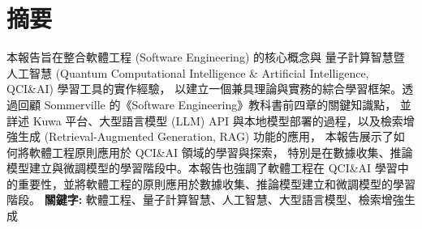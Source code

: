\documentclass[twocolumn,11pt,a4paper]{article}
\begin{document}

\section*{摘要}
本報告旨在整合軟體工程 (Software Engineering) 的核心概念與
量子計算智慧暨人工智慧 (Quantum Computational Intelligence \& Artificial Intelligence, QCI\&AI) 學習工具的實作經驗，
以建立一個兼具理論與實務的綜合學習框架。透過回顧 Sommerville 的《Software Engineering》教科書前四章的關鍵知識點，
並詳述 Kuwa 平台、大型語言模型 (LLM) API 與本地模型部署的過程，以及檢索增強生成 (Retrieval-Augmented Generation, RAG) 功能的應用，
本報告展示了如何將軟體工程原則應用於 QCI\&AI 領域的學習與探索，
特別是在數據收集、推論模型建立與微調模型的學習階段中。本報告也強調了軟體工程在 QCI\&AI 學習中的重要性，並將軟體工程的原則應用於數據收集、推論模型建立和微調模型的學習階段。
\linebreak \linebreak 
\noindent \textbf{關鍵字:} 軟體工程、量子計算智慧、人工智慧、大型語言模型、檢索增強生成
\end{document}
